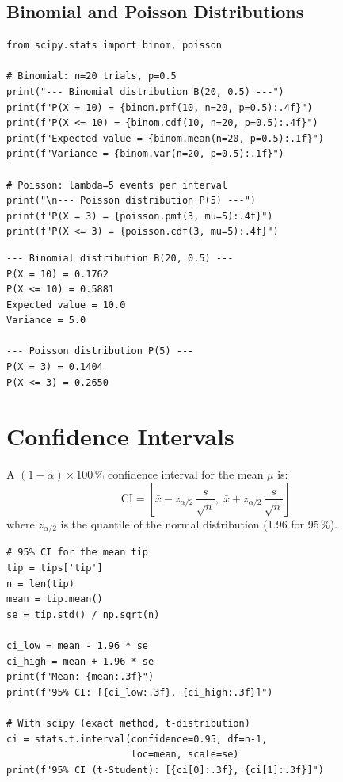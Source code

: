 \subsection{Binomial and Poisson Distributions}

\begin{codeblock}[title=\textbf{Python}]
\begin{verbatim}
from scipy.stats import binom, poisson

# Binomial: n=20 trials, p=0.5
print("--- Binomial distribution B(20, 0.5) ---")
print(f"P(X = 10) = {binom.pmf(10, n=20, p=0.5):.4f}")
print(f"P(X <= 10) = {binom.cdf(10, n=20, p=0.5):.4f}")
print(f"Expected value = {binom.mean(n=20, p=0.5):.1f}")
print(f"Variance = {binom.var(n=20, p=0.5):.1f}")

# Poisson: lambda=5 events per interval
print("\n--- Poisson distribution P(5) ---")
print(f"P(X = 3) = {poisson.pmf(3, mu=5):.4f}")
print(f"P(X <= 3) = {poisson.cdf(3, mu=5):.4f}")
\end{verbatim}
\end{codeblock}

\begin{codeoutput}
\begin{verbatim}
--- Binomial distribution B(20, 0.5) ---
P(X = 10) = 0.1762
P(X <= 10) = 0.5881
Expected value = 10.0
Variance = 5.0

--- Poisson distribution P(5) ---
P(X = 3) = 0.1404
P(X <= 3) = 0.2650
\end{verbatim}
\end{codeoutput}

\section{Confidence Intervals}

\begin{definition}
A $(1-\alpha)\times 100\,\%$ confidence interval for the mean $\mu$ is:
\[
\text{CI} = \left[\bar{x} - z_{\alpha/2}\,\frac{s}{\sqrt{n}},\; \bar{x} + z_{\alpha/2}\,\frac{s}{\sqrt{n}}\right]
\]
where $z_{\alpha/2}$ is the quantile of the normal distribution (1.96 for 95\,\%).
\end{definition}

\begin{codeblock}[title=\textbf{Python}]
\begin{verbatim}
# 95% CI for the mean tip
tip = tips['tip']
n = len(tip)
mean = tip.mean()
se = tip.std() / np.sqrt(n)

ci_low = mean - 1.96 * se
ci_high = mean + 1.96 * se
print(f"Mean: {mean:.3f}")
print(f"95% CI: [{ci_low:.3f}, {ci_high:.3f}]")

# With scipy (exact method, t-distribution)
ci = stats.t.interval(confidence=0.95, df=n-1,
                      loc=mean, scale=se)
print(f"95% CI (t-Student): [{ci[0]:.3f}, {ci[1]:.3f}]")
\end{verbatim}
\end{codeblock}

